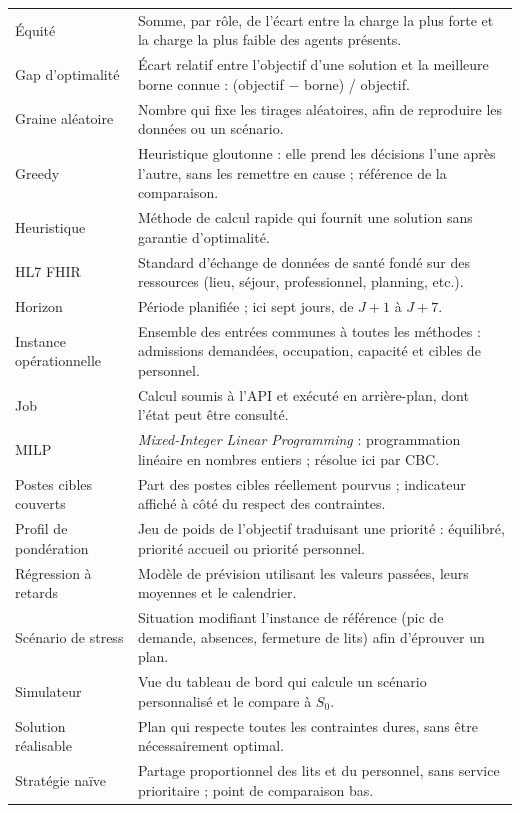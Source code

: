 \begin{longtable}{>{\raggedright\arraybackslash}p{3.6cm} >{\raggedright\arraybackslash}p{11.4cm}}
Équité & Somme, par rôle, de l'écart entre la charge la plus forte et la charge la plus faible des agents présents. \\
Gap d'optimalité & Écart relatif entre l'objectif d'une solution et la meilleure borne connue : (objectif $-$ borne) / objectif. \\
Graine aléatoire & Nombre qui fixe les tirages aléatoires, afin de reproduire les données ou un scénario. \\
Greedy & Heuristique gloutonne : elle prend les décisions l'une après l'autre, sans les remettre en cause ; référence de la comparaison. \\
Heuristique & Méthode de calcul rapide qui fournit une solution sans garantie d'optimalité. \\
HL7 FHIR & Standard d'échange de données de santé fondé sur des ressources (lieu, séjour, professionnel, planning, etc.). \\
Horizon & Période planifiée ; ici sept jours, de $J+1$ à $J+7$. \\
Instance opérationnelle & Ensemble des entrées communes à toutes les méthodes : admissions demandées, occupation, capacité et cibles de personnel. \\
Job & Calcul soumis à l'API et exécuté en arrière-plan, dont l'état peut être consulté. \\
MILP & \textit{Mixed-Integer Linear Programming} : programmation linéaire en nombres entiers ; résolue ici par CBC. \\
Postes cibles couverts & Part des postes cibles réellement pourvus ; indicateur affiché à côté du respect des contraintes. \\
Profil de pondération & Jeu de poids de l'objectif traduisant une priorité : équilibré, priorité accueil ou priorité personnel. \\
Régression à retards & Modèle de prévision utilisant les valeurs passées, leurs moyennes et le calendrier. \\
Scénario de stress & Situation modifiant l'instance de référence (pic de demande, absences, fermeture de lits) afin d'éprouver un plan. \\
Simulateur & Vue du tableau de bord qui calcule un scénario personnalisé et le compare à $S_0$. \\
Solution réalisable & Plan qui respecte toutes les contraintes dures, sans être nécessairement optimal. \\
Stratégie naïve & Partage proportionnel des lits et du personnel, sans service prioritaire ; point de comparaison bas. \\

\end{longtable}
